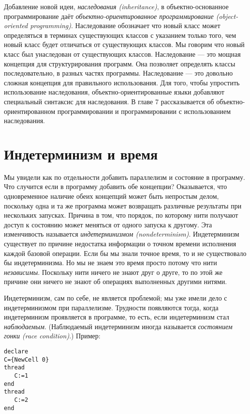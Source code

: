 Добавление новой идеи, \emph{наследования (inheritance)}, в объектно-ос\-но\-ван\-ное программирование даёт \emph{объектно-ориентированное программирование (object-oriented programming)}. Наследование обозначает что новый класс может определяться в терминах существующих классов с указанием только того, чем новый класс будет отличаться от существующих классов. Мы говорим что новый класс был унаследован от существующих классов. Наследование --- это мощная концепция для структурирования программ. Она позволяет определять классы последовательно, в разных частях программы. Наследование --- это довольно сложная концепция для правильного использования. Для того, чтобы упростить использование наследования, объектно-ориентированные языки добавляют специальный синтаксис для наследования. В главе 7 рассказывается об объектно-ориентированном программировании и программировании с использованием наследования.

\section{Индетерминизм и время}

Мы увидели как по отдельности добавить параллелизм и состояние в программу. Что случится если в программу добавить обе концепции? Оказывается, что одновременное наличие обеих концепций может быть непростым делом, поскольку одна и та же программа может возвращать различные результаты при нескольких запусках. Причина в том, что порядок, по которому нити получают доступ к состоянию может меняться от одного запуска к другому. Эта изменчивость называется \emph{индетерминизмом (nondeterminism)}. Индетерминизм существует по причине недостатка информации о точном времени исполнения каждой базовой операции. Если бы мы знали точное время, то и не существовало бы индетерминизма. Но мы не знаем это время просто потому что нити \emph{независимы}. Поскольку нити ничего не знают друг о друге, то по этой же причине они ничего не знают об операциях выполненных другими нитями.

Индетерминизм, сам по себе, не является проблемой; мы уже имели дело с индетерминизмом при параллелизме. Трудности появляются тогда, когда индетерминизм проявляется в программе, то есть, если индетерминизм стал \emph{наблюдаемым}. (Наблюдаемый индетерминизм иногда называется \emph{состоянием гонки (race condition)}.) Пример:

\begin{lstlisting}
declare
C={NewCell 0}
thread
   C:=1
end
thread
   C:=2
end
\end{lstlisting}


